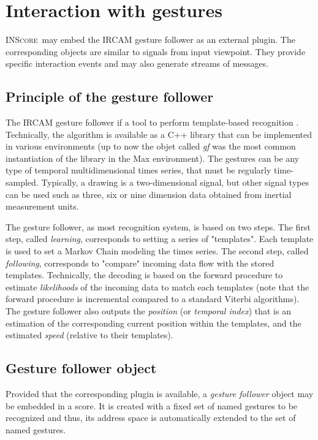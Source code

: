 \documentclass{article}
\newcommand{\inscore}		{\textsc{\small INScore}}
\begin{document}
\section{Interaction with gestures}\label{sec:igf}

\inscore\ may embed the IRCAM gesture follower as an external plugin. The corresponding objects are similar to signals from input viewpoint. They provide specific interaction events and may also generate streams of messages.

\subsection{Principle of the gesture follower}\label{sec:pgf}
The IRCAM gesture follower if a tool to perform template-based recognition \cite{bevilacqua10,Bevilacqua2011}. Technically, the algorithm is available as a C++ library that can be implemented in various environments (up to now the  objet called \emph{gf} was the most common instantiation of the library in the Max environment). The gestures can be any type of temporal multidimensional times series, that must be regularly time-sampled. Typically, a drawing is a two-dimensional signal, but other signal types can be used such as three, six or nine dimension data obtained from inertial measurement units.

The gesture follower, as most recognition system, is based on two steps. The first step, called \emph{learning}, corresponds to setting a series of "templates". Each template is used to set a Markov Chain modeling the times series. The second step, called  \emph{following}, corresponds to "compare" incoming data flow with the stored templates. Technically, the decoding is based on the forward procedure to estimate \emph{likelihoods} of the incoming data to match each templates (note that the forward procedure is incremental compared to a standard Viterbi algorithms). The gesture follower also outputs  the \emph{position} (or \emph{temporal index}) that is an estimation of the corresponding current position within the templates, and the estimated \emph{speed} (relative to their templates).

\subsection{Gesture follower object}\label{sec:gfo}

Provided that the corresponding plugin is available, a \emph{gesture follower} object may be embedded in a score. It is created with a fixed set of named gestures to be recognized and thus, its address space is automatically extended to the set of named gestures.
\end{document}
